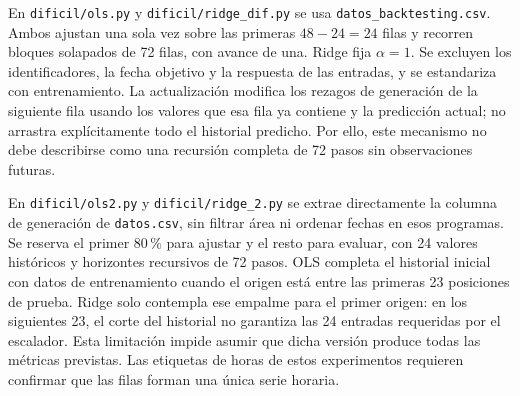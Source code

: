 En \texttt{dificil/ols.py} y \texttt{dificil/ridge\_dif.py} se usa \texttt{datos\_backtesting.csv}. Ambos ajustan una sola vez sobre las primeras $48-24=24$ filas y recorren bloques solapados de 72 filas, con avance de una. Ridge fija $\alpha=1$. Se excluyen los identificadores, la fecha objetivo y la respuesta de las entradas, y se estandariza con entrenamiento. La actualización modifica los rezagos de generación de la siguiente fila usando los valores que esa fila ya contiene y la predicción actual; no arrastra explícitamente todo el historial predicho. Por ello, este mecanismo no debe describirse como una recursión completa de 72 pasos sin observaciones futuras.

En \texttt{dificil/ols2.py} y \texttt{dificil/ridge\_2.py} se extrae directamente la columna de generación de \texttt{datos.csv}, sin filtrar área ni ordenar fechas en esos programas. Se reserva el primer 80\,\% para ajustar y el resto para evaluar, con 24 valores históricos y horizontes recursivos de 72 pasos. OLS completa el historial inicial con datos de entrenamiento cuando el origen está entre las primeras 23 posiciones de prueba. Ridge solo contempla ese empalme para el primer origen: en los siguientes 23, el corte del historial no garantiza las 24 entradas requeridas por el escalador. Esta limitación impide asumir que dicha versión produce todas las métricas previstas. Las etiquetas de horas de estos experimentos requieren confirmar que las filas forman una única serie horaria.
